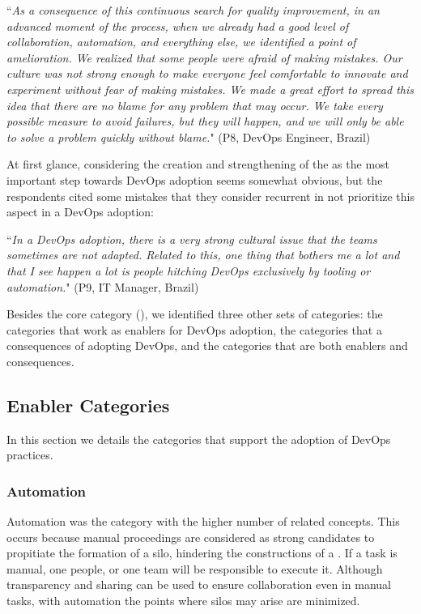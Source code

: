 \begin{mq}
``\emph{As a consequence of this continuous search for quality improvement, in an
advanced moment of the process, when we already had a good level of
collaboration, automation, and everything else, we identified a point of
amelioration. We realized that some people were afraid of making mistakes. Our
culture was not strong enough to make everyone feel comfortable to innovate and
experiment without fear of making mistakes. We made a great effort to spread
this idea that there are no blame for any problem that may occur. We take every possible
measure to avoid failures, but they
will happen, and we will only be able to solve a problem quickly without blame.}" (P8,
DevOps Engineer, Brazil)
\end{mq}

At first glance, considering the creation and strengthening of the  as the most important step towards DevOps adoption seems somewhat obvious, but
the respondents cited some mistakes that they consider recurrent in not
prioritize this aspect in a DevOps adoption:

\begin{mq}``\emph{In a DevOps adoption, there is a very strong cultural issue that the teams
sometimes are not adapted. Related to this, one thing that bothers me a lot and
that I see happen a lot is people hitching DevOps exclusively by tooling or
automation.}" (P9, IT Manager, Brazil)
\end{mq}

Besides the core category (), we identified
three other sets of categories: the categories that work as enablers
for DevOps adoption, the categories that a consequences of adopting
DevOps, and the categories that are both enablers and consequences.

\subsection{Enabler Categories}

In this section we details the categories that support the adoption of
DevOps practices. 
\subsubsection{Automation} \label{ssec:automation}

Automation was the category with the higher number of related concepts. This
occurs because manual proceedings are considered as strong candidates to
propitiate the formation of a silo, hindering the constructions
of a . If a task is manual, one people, or one
team will be responsible to execute it. Although transparency and sharing can
be used to ensure collaboration even in manual tasks, with automation the
points where silos may arise are minimized.

